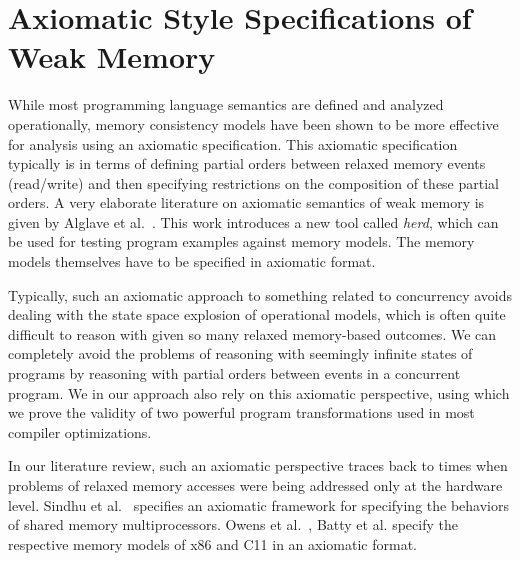\section{Axiomatic Style Specifications of Weak Memory}

While most programming language semantics are defined and analyzed operationally, memory consistency models have been shown to be more effective for analysis using an axiomatic specification.
This axiomatic specification typically is in terms of defining partial orders between relaxed memory events (read/write) and then specifying restrictions on the composition of these partial orders. 
A very elaborate literature on axiomatic semantics of weak memory is given by Alglave et al.~\cite{Alglave}. 
This work introduces a new tool called \textit{herd}, which can be used for testing program examples against memory models. The memory models themselves have to be specified in axiomatic format. 

Typically, such an axiomatic approach to something related to concurrency avoids dealing with the state space explosion of operational models, which is often quite difficult to reason with given so many relaxed memory-based outcomes. 
We can completely avoid the problems of reasoning with seemingly infinite states of programs by reasoning with partial orders between events in a concurrent program.
We in our approach also rely on this axiomatic perspective, using which we prove the validity of two powerful program transformations used in most compiler optimizations. 

In our literature review, such an axiomatic perspective traces back to times when problems of relaxed memory accesses were being addressed only at the hardware level. 
Sindhu et al.~\cite{Sindhu} specifies an axiomatic framework for specifying the behaviors of shared memory multiprocessors. 
Owens et al.~\cite{OwensS}, Batty et al.\cite{BattyM} specify the respective memory models of x86 and C11 in an axiomatic format. 




